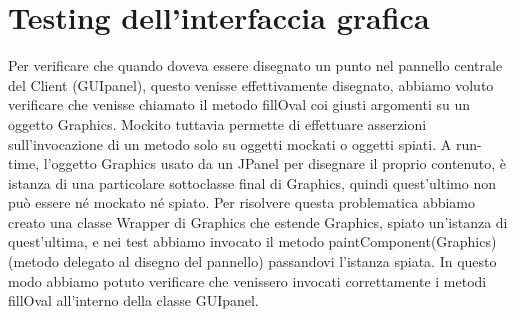 \section{Testing dell'interfaccia grafica}
Per verificare che quando doveva essere disegnato un punto nel pannello centrale del Client (GUIpanel), questo venisse effettivamente disegnato, abbiamo voluto verificare che venisse chiamato il metodo fillOval coi giusti argomenti su un oggetto Graphics. Mockito tuttavia permette di effettuare asserzioni sull'invocazione di un metodo solo su oggetti mockati o oggetti spiati. A run-time, l'oggetto Graphics usato da un JPanel per disegnare il proprio contenuto, \`e istanza di una particolare sottoclasse final di Graphics, quindi quest'ultimo non pu\`o essere n\'e mockato n\'e spiato. Per risolvere questa problematica abbiamo creato una classe Wrapper di Graphics che estende Graphics, spiato un'istanza di quest'ultima, e nei test abbiamo invocato il metodo paintComponent(Graphics) (metodo delegato al disegno del pannello) passandovi l'istanza spiata. In questo modo abbiamo potuto verificare che venissero invocati correttamente i metodi fillOval all'interno della classe GUIpanel.
